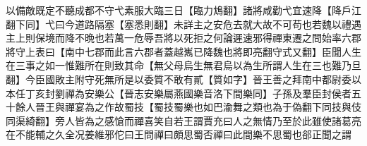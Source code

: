 以備敵既定不聽成都不守弋素服大臨三日【臨力鴆翻】諸將咸勸弋宜速降【降戶江翻下同】弋曰今道路隔塞【塞悉則翻】未詳主之安危去就大故不可苟也若魏以禮遇主上則保境而降不晩也若萬一危辱吾將以死拒之何論遲速邪得禪東遷之問始率六郡將守上表曰【南中七郡而此言六郡者蓋越嶲已降魏也將即亮翻守式又翻】臣聞人生在三事之如一惟難所在則致其命【無父母烏生無君烏以為生所謂人生在三也難乃旦翻】今臣國敗主附守死無所是以委質不敢有貳【質如字】晉王善之拜南中都尉委以本任丁亥封劉禪為安樂公【晉志安樂屬燕國樂音洛下間樂同】子孫及羣臣封侯者五十餘人晉王與禪宴為之作故蜀技【蜀技蜀樂也如巴渝舞之類也為于偽翻下同技與伎同渠綺翻】旁人皆為之感愴而禪喜笑自若王謂賈充曰人之無情乃至於此雖使諸葛亮在不能輔之久全况姜維邪佗曰王問禪曰頗思蜀否禪曰此間樂不思蜀也郤正聞之謂